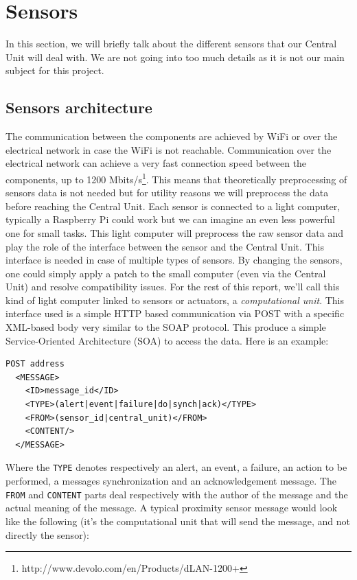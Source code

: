 \documentclass{acm_proc_article-sp}
\begin{document}
\section{Sensors}\label{sensors_section}
In this section, we will briefly talk about the different sensors that our Central Unit will deal with. 
We are not going into too much details as it is not our main subject for this project.
\subsection{Sensors architecture}
The communication between the components are achieved by WiFi or over the electrical network in case the WiFi is not reachable. 
Communication over the electrical network can achieve a very fast connection speed between the components, up to 1200 Mbits/s\footnote{http://www.devolo.com/en/Products/dLAN-1200+}. 
This means that theoretically preprocessing of sensors data is not needed but for utility reasons we will preprocess the data before reaching the Central Unit.
Each sensor is connected to a light computer, typically a Raspberry Pi could work but we can imagine an even less powerful one for small tasks. 
This light computer will preprocess the raw sensor data and play the role of the interface between the sensor and the Central Unit. 
This interface is needed in case of multiple types of sensors. By changing the sensors, one could simply apply a patch to the small computer (even via the Central Unit) and resolve compatibility issues. For the rest of this report, we'll call this kind of light computer linked to sensors or actuators, a \textit{computational unit}.
This interface used is a simple HTTP based communication via POST with a specific XML-based body very similar to the SOAP protocol. 
This produce a simple Service-Oriented Architecture (SOA) to access the data. 
Here is an example:

\begin{minipage}{\linewidth}
\begin{lstlisting}
POST address 
  <MESSAGE>
    <ID>message_id</ID>
    <TYPE>(alert|event|failure|do|synch|ack)</TYPE>
    <FROM>(sensor_id|central_unit)</FROM>
    <CONTENT/>
  </MESSAGE>
\end{lstlisting}
\end{minipage}

Where the \texttt{TYPE} denotes respectively an alert, an event, a failure, an action to be performed, a messages synchronization and an acknowledgement message. 
The \texttt{FROM} and \texttt{CONTENT} parts deal respectively with the author of the message and the actual meaning of the message. 
A typical proximity sensor message would look like the following (it's the computational unit that will send the message, and not directly the sensor):
\end{document}
